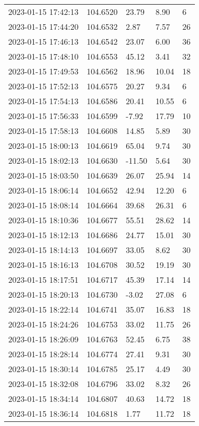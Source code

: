 \documentclass{nature_plusfigure}
\begin{document}
\begin{supplement}
\begin{center}
\begin{longtable}{lllll}
2023-01-15 17:42:13 & 104.6520 & 23.79 & 8.90 & 6 \\ 
2023-01-15 17:44:20 & 104.6532 & 2.87 & 7.57 & 26 \\ 
2023-01-15 17:46:13 & 104.6542 & 23.07 & 6.00 & 36 \\ 
2023-01-15 17:48:10 & 104.6553 & 45.12 & 3.41 & 32 \\ 
2023-01-15 17:49:53 & 104.6562 & 18.96 & 10.04 & 18 \\ 
2023-01-15 17:52:13 & 104.6575 & 20.27 & 9.34 & 6 \\ 
2023-01-15 17:54:13 & 104.6586 & 20.41 & 10.55 & 6 \\ 
2023-01-15 17:56:33 & 104.6599 & -7.92 & 17.79 & 10 \\ 
2023-01-15 17:58:13 & 104.6608 & 14.85 & 5.89 & 30 \\ 
2023-01-15 18:00:13 & 104.6619 & 65.04 & 9.74 & 30 \\ 
2023-01-15 18:02:13 & 104.6630 & -11.50 & 5.64 & 30 \\ 
2023-01-15 18:03:50 & 104.6639 & 26.07 & 25.94 & 14 \\ 
2023-01-15 18:06:14 & 104.6652 & 42.94 & 12.20 & 6 \\ 
2023-01-15 18:08:14 & 104.6664 & 39.68 & 26.31 & 6 \\ 
2023-01-15 18:10:36 & 104.6677 & 55.51 & 28.62 & 14 \\ 
2023-01-15 18:12:13 & 104.6686 & 24.77 & 15.01 & 30 \\ 
2023-01-15 18:14:13 & 104.6697 & 33.05 & 8.62 & 30 \\ 
2023-01-15 18:16:13 & 104.6708 & 30.52 & 19.19 & 30 \\ 
2023-01-15 18:17:51 & 104.6717 & 45.39 & 17.14 & 14 \\ 
2023-01-15 18:20:13 & 104.6730 & -3.02 & 27.08 & 6 \\ 
2023-01-15 18:22:14 & 104.6741 & 35.07 & 16.83 & 18 \\ 
2023-01-15 18:24:26 & 104.6753 & 33.02 & 11.75 & 26 \\ 
2023-01-15 18:26:09 & 104.6763 & 52.45 & 6.75 & 38 \\ 
2023-01-15 18:28:14 & 104.6774 & 27.41 & 9.31 & 30 \\ 
2023-01-15 18:30:14 & 104.6785 & 25.17 & 4.49 & 30 \\ 
2023-01-15 18:32:08 & 104.6796 & 33.02 & 8.32 & 26 \\ 
2023-01-15 18:34:14 & 104.6807 & 40.63 & 14.72 & 18 \\ 
2023-01-15 18:36:14 & 104.6818 & 1.77 & 11.72 & 18 \\ 

\end{longtable}
\end{center}
\end{supplement}
\end{document}
